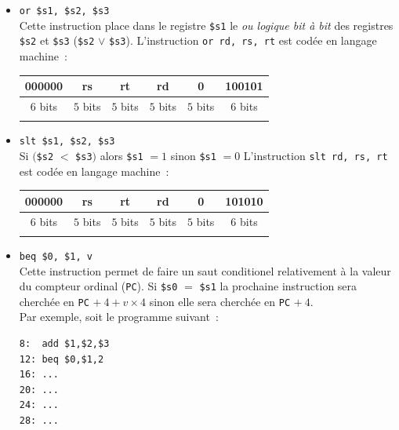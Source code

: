 \documentclass[12pt]{article}
\begin{document}
\begin{itemize}
\item \verb+or $s1, $s2, $s3+\\
Cette instruction place dans le registre \verb+$s1+ le \emph{ou logique bit à bit}
des registres \verb+$s2+ et \verb+$s3+ (\verb+$s2+ $\vee$ \verb+$s3+).
L'instruction \verb+or rd, rs, rt+ est codée en langage machine~:\\
\begin{center}
\begin{tabular}{cccccc}
\hline
\multicolumn{1}{|c}{000000} & \multicolumn{1}{|c}{rs} & \multicolumn{1}{|c}{rt} & \multicolumn{1}{|c|}{rd} & \multicolumn{1}{|c|}{0} & \multicolumn{1}{|c|}{100101}\\
\hline
$6$ bits & $5$ bits & $5$ bits & $5$ bits & $5$ bits & $6$ bits\\
&&&&&\\
\end{tabular}
\end{center}

\item \verb+slt $s1, $s2, $s3+\\
Si $($\verb+$s2+ $<$ \verb+$s3+$)$  alors \verb+$s1+ $= 1$ sinon \verb+$s1+ $= 0$
L'instruction \verb+slt rd, rs, rt+ est codée en langage machine~:\\
\begin{center}
\begin{tabular}{cccccc}
\hline
\multicolumn{1}{|c}{000000} & \multicolumn{1}{|c}{rs} & \multicolumn{1}{|c}{rt} & \multicolumn{1}{|c|}{rd} & \multicolumn{1}{|c|}{0} & \multicolumn{1}{|c|}{101010}\\
\hline
$6$ bits & $5$ bits & $5$ bits & $5$ bits & $5$ bits & $6$ bits\\
&&&&&\\
\end{tabular}
\end{center}

\item \verb+beq $0, $1, v+\\
Cette instruction permet de faire un saut conditionel relativement à la valeur du compteur ordinal (\verb+PC+).
Si \verb+$s0+ $=$ \verb+$s1+ la prochaine instruction sera cherchée en \verb+PC+ $+\ 4 + v \times 4$ sinon elle sera cherchée en \verb+PC+ $+\ 4$.\\
Par exemple, soit le programme suivant~:\\
\begin{verbatim}
8:  add $1,$2,$3
12: beq $0,$1,2
16: ...
20: ...
24: ...
28: ...
\end{verbatim}


\end{itemize}
\end{document}
